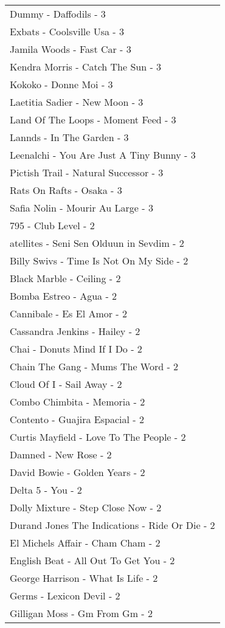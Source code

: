 \documentclass[
]{article}
\begin{document}
\begin{longtable}{l}
Dummy - Daffodils - 3 \\ 
Exbats - Coolsville Usa - 3 \\ 
Jamila Woods - Fast Car - 3 \\ 
Kendra Morris - Catch The Sun - 3 \\ 
Kokoko - Donne Moi - 3 \\ 
Laetitia Sadier - New Moon - 3 \\ 
Land Of The Loops - Moment Feed - 3 \\ 
Lannds - In The Garden - 3 \\ 
Leenalchi - You Are Just A Tiny Bunny - 3 \\ 
Pictish Trail - Natural Successor - 3 \\ 
Rats On Rafts - Osaka - 3 \\ 
Safia Nolin - Mourir Au Large - 3 \\ 
795 - Club Level - 2 \\ 
atellites - Seni Sen Olduun in Sevdim - 2 \\ 
Billy Swivs - Time Is Not On My Side - 2 \\ 
Black Marble - Ceiling - 2 \\ 
Bomba Estreo - Agua - 2 \\ 
Cannibale - Es El Amor - 2 \\ 
Cassandra Jenkins - Hailey - 2 \\ 
Chai - Donuts Mind If I Do - 2 \\ 
Chain The Gang - Mums The Word - 2 \\ 
Cloud Of I - Sail Away - 2 \\ 
Combo Chimbita - Memoria - 2 \\ 
Contento - Guajira Espacial - 2 \\ 
Curtis Mayfield - Love To The People - 2 \\ 
Damned - New Rose - 2 \\ 
David Bowie - Golden Years - 2 \\ 
Delta 5 - You - 2 \\ 
Dolly Mixture - Step Close Now - 2 \\ 
Durand Jones The Indications - Ride Or Die - 2 \\ 
El Michels Affair - Cham Cham - 2 \\ 
English Beat - All Out To Get You - 2 \\ 
George Harrison - What Is Life - 2 \\ 
Germs - Lexicon Devil - 2 \\ 
Gilligan Moss - Gm From Gm - 2 \\ 

\end{longtable}
\end{document}
